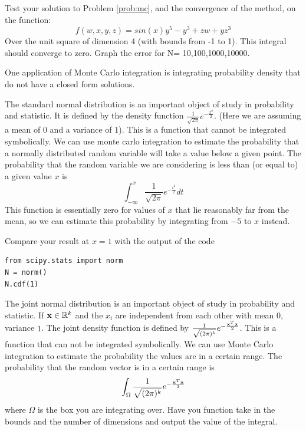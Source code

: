 \begin{problem}
\label{prob:mc_test}
Test your solution to Problem \ref{prob:mc}, and the convergence of the method, on the function:
\[
f(w,x,y,z) = sin(x) y^5 -y^3 + zw + yz^3
\]
Over the unit square of dimension 4 (with bounds from -1 to 1). 
This integral should converge to zero. Graph the error for N= 10,100,1000,10000.
\end{problem}

One application of Monte Carlo integration is integrating probability density that do not have a closed form solutions.

\begin{problem}
The standard normal distribution is an important object of study in probability and statistic.
It is defined by the density function $\frac{1}{\sqrt{2 \pi}} e^{- \frac{x^2}{2}}$.
(Here we are assuming a mean of $0$ and a variance of $1$).
This is a function that cannot be integrated symbolically.
We can use monte carlo integration to estimate the probability that a normally distributed random variable will take a value below a given point.
The probability that the random variable we are considering is less than (or equal to) a given value $x$ is
\[\int_{-\infty}^x \frac{1}{\sqrt{2 \pi}} e^{- \frac{t^2}{2}} dt\]
This function is essentially zero for values of $x$ that lie reasonably far from the mean, so we can estimate this probability by integrating from $-5$ to $x$ instead.

Compare your result at $x = 1$ with the output of the code
\begin{lstlisting}
from scipy.stats import norm
N = norm()
N.cdf(1)
\end{lstlisting}
\end{problem}

\begin{problem}
The joint normal distribution is an important object of study in probability and statistic. 
If $\bold{x} \in \mathbb{R}^k$ and the $x_i$ are independent from each other with mean $0$, variance $1$. 
The joint density function is defined by $\frac{1}{\sqrt{(2 \pi)^k}} e^{- \frac{\bold{x}^T\bold{x}}{2}}$.
This is a function that can not be integrated symbolically.
We can use Monte Carlo integration to estimate the probability the values are in a certain range.
The probability that the random vector is in a certain range is
\[
\int_{\Omega} \frac{1}{\sqrt{(2 \pi)^k}} e^{- \frac{\bold{x}^T\bold{x}}{2}}
\]
where $\Omega$ is the box you are integrating over.
Have you function take in the bounds and the number of dimensions and output the value of the integral.

\end{problem}

